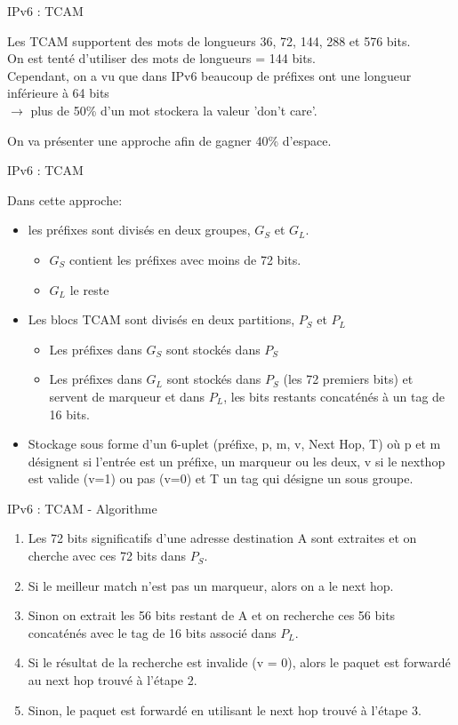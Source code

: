 \documentclass{beamer}
\begin{document}
\begin{frame}{IPv6 : TCAM}

Les TCAM supportent des mots de longueurs 36, 72, 144, 288 et 576 bits. \\
On est tenté d'utiliser des mots de longueurs = 144 bits. \\
Cependant, on a vu que dans IPv6 beaucoup de préfixes ont une longueur inférieure à 64 bits \\
\pause $\rightarrow$ plus de 50\% d'un mot stockera la valeur 'don't care'. 

On va présenter une approche afin de gagner 40\% d'espace. 

\end{frame}

\begin{frame}{IPv6 : TCAM}

Dans cette approche: 
\begin{itemize}
\item les préfixes sont divisés en deux groupes, $G_S$ et $G_L$.
\begin{itemize}
\item $G_S$ contient les préfixes avec moins de 72 bits. 
\item $G_L$ le reste
\end{itemize}
\pause \item Les blocs TCAM sont divisés en deux partitions, $P_S$ et $P_L$
\begin{itemize}
\item Les préfixes dans $G_S$ sont stockés dans $P_S$
\item Les préfixes dans $G_L$ sont stockés dans $P_S$ (les 72 premiers bits) et servent de marqueur
 et dans $P_L$, les bits restants concaténés à un tag de 16 bits. 
\end{itemize}
\pause \item Stockage sous forme d'un 6-uplet (préfixe, p, m, v, Next Hop, T) où p et m désignent si l'entrée
est un préfixe, un marqueur ou les deux, v si le nexthop est valide (v=1) ou pas (v=0) et T un tag qui désigne un 
sous groupe. 
\end{itemize} 

\end{frame}

\begin{frame}{IPv6 : TCAM - Algorithme}
\begin{enumerate}
\item Les 72 bits significatifs d'une adresse destination A sont extraites et on cherche avec ces 72 bits dans $P_S$.
\pause \item Si le meilleur match n'est pas un marqueur, alors on a le next hop.
\pause \item Sinon on extrait les 56 bits restant de A et on recherche ces 56 bits concaténés avec le tag
de 16 bits associé dans $P_L$. 
\pause \item Si le résultat de la recherche est invalide (v = 0), alors le paquet est forwardé au next hop 
trouvé à l'étape 2.
\pause \item Sinon, le paquet est forwardé en utilisant le next hop trouvé à l'étape 3. 
\end{enumerate}
\end{frame}
\end{document}

